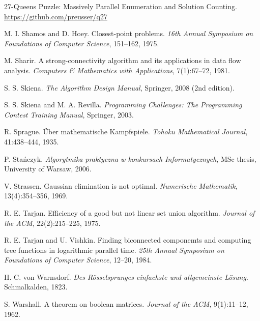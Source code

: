 \begin{thebibliography}{9}
  27-Queens Puzzle: Massively Parallel Enumeration and Solution Counting.
  \url{https://github.com/preusser/q27}

  M. I. Shamos and D. Hoey.
  Closest-point problems.
  \emph{16th Annual Symposium on Foundations of Computer Science}, 151--162, 1975.

  M. Sharir.
  A strong-connectivity algorithm and its applications in data flow analysis.
  \emph{Computers \& Mathematics with Applications}, 7(1):67--72, 1981.

  S. S. Skiena.
  \emph{The Algorithm Design Manual}, Springer, 2008 (2nd edition).

  S. S. Skiena and M. A. Revilla.
  \emph{Programming Challenges: The Programming Contest Training Manual},
  Springer, 2003.

  R. Sprague.
  Über mathematische Kampfspiele.
  \emph{Tohoku Mathematical Journal}, 41:438--444, 1935.

  P. Stańczyk.
  \emph{Algorytmika praktyczna w konkursach Informatycznych},
  MSc thesis, University of Warsaw, 2006.

  V. Strassen.
  Gaussian elimination is not optimal.
  \emph{Numerische Mathematik}, 13(4):354--356, 1969.

  R. E. Tarjan.
  Efficiency of a good but not linear set union algorithm.
  \emph{Journal of the ACM}, 22(2):215--225, 1975.

  R. E. Tarjan and U. Vishkin.
  Finding biconnected componemts and computing tree functions in logarithmic parallel time.
  \emph{25th Annual Symposium on Foundations of Computer Science}, 12--20, 1984.


  H. C. von Warnsdorf.
  \emph{Des Rösselsprunges einfachste und allgemeinste Lösung}.
  Schmalkalden, 1823.

  S. Warshall.
  A theorem on boolean matrices.
  \emph{Journal of the ACM}, 9(1):11--12, 1962.


\end{thebibliography}
